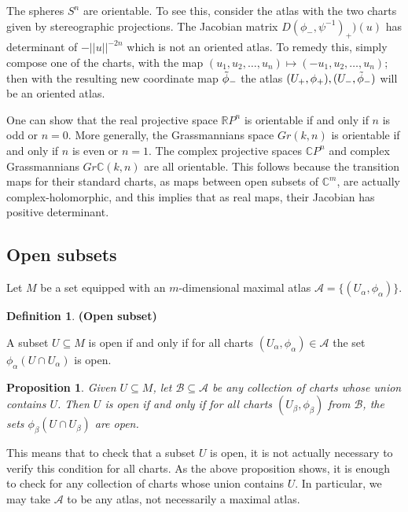 \documentclass{article}
\newtheorem{proposition}{Proposition}[theorem]
\theoremstyle{definition}
\newtheorem{defn}[theorem]{Definition}
\newenvironment{definition}
  {\vspace{8pt}\begin{mdframed}[backgroundcolor=blueish]\begin{defn}}
  {\end{defn}\end{mdframed}\vspace{4pt}}
\begin{document}
The spheres $S^n$ are orientable. To see this, consider the atlas with the two charts given by stereographic projections. The Jacobian matrix $D(\phi_-, \psi^{-1})_+)(u)$ has determinant of $-||u||^{-2n}$ which  is not an oriented atlas. To remedy this, simply compose one of the charts, with the map $(u_1,u_2,\dots,u_n) \mapsto (-u_1,u_2,\dots,u_n)$; then with the resulting new coordinate map $\Tilde{\phi}_-$ the atlas $(U_+,\phi_+),(U_-,\Tilde{\phi}_-)$ will be an oriented atlas.

One can show that the real projective space $\mathbb R P^n$ is orientable if and only if $n$ is odd or $n = 0$. More generally, the Grassmannians space $Gr(k,n)$ is orientable if and only if $n$ is even or $n = 1$. The complex projective spaces $\mathbb C P^n$ and complex Grassmannians $Gr \mathbb C(k,n)$ are all orientable. This
follows because the transition maps for their standard charts, as maps between open subsets of $\mathbb C^m$, are actually complex-holomorphic, and this implies that as real maps, their Jacobian has positive determinant.


\subsection{Open subsets}

Let $M$ be a set equipped with an $m$-dimensional maximal atlas $\mathscr{A} =  \{(U_\alpha, \phi_\alpha) \}$.

\begin{definition} \textbf{(Open subset)}

A subset $U \subseteq M$ is open if and only if for all charts $(U_\alpha, \phi_\alpha) \in \mathscr{A}$ the set $\phi_\alpha(U  \cap U_\alpha)$ is open.
\end{definition}

\begin{proposition}

Given $U \subseteq M$, let $ \mathscr{B} \subseteq \mathscr{A}$ be any collection of charts whose union contains $U$. Then $U$ is open if and only if for all charts $(U_\beta,\phi_\beta)$ from $\mathscr{B}$, the sets $\phi_{\beta}(U \cap U_\beta)$ are open.
\end{proposition}

This means that to check that a subset $U$ is open, it is not actually necessary to verify this condition for all charts. As the above proposition shows, it is enough to check for any collection of charts whose union contains $U$. In particular, we may take $\mathscr{A}$ to be any atlas, not necessarily a maximal atlas.
\end{document}

